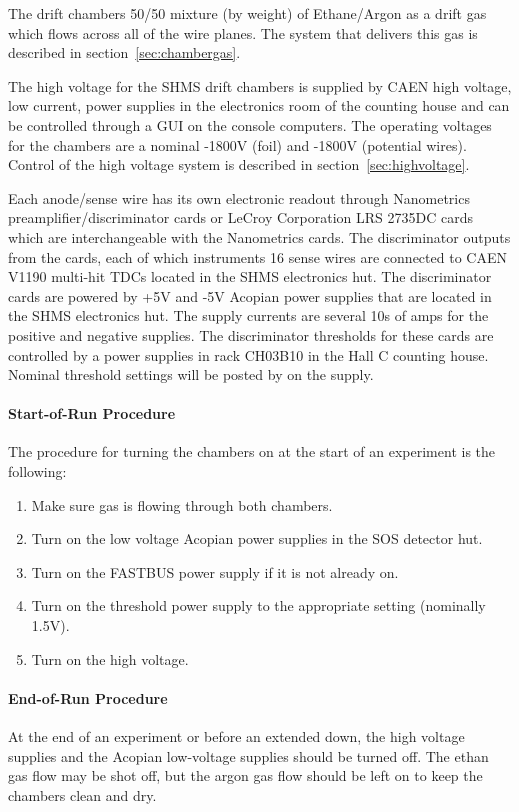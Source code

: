 {The drift chambers 50/50 mixture (by weight) of Ethane/Argon as a
drift gas which
flows across all of the wire planes.  The system that delivers this
gas is described in section~\ref{sec:chambergas}.

The high voltage for the SHMS drift chambers is supplied by CAEN
high voltage, low current, power supplies in the electronics room of
the counting
house and can be controlled through a GUI on the console computers.
The operating voltages for the chambers are a nominal -1800V (foil) and -1800V
(potential wires).  Control of the high voltage system is described in
section~\ref{sec:highvoltage}.

Each anode/sense wire has its own electronic readout through
Nanometrics preamplifier/discriminator cards or LeCroy Corporation LRS
2735DC cards which are interchangeable with the Nanometrics cards.
The discriminator outputs from the cards, each of which instruments 16
sense wires are connected to CAEN V1190 multi-hit TDCs located in the
SHMS electronics hut.
The discriminator cards are powered by +5V and -5V Acopian power
supplies that are
located in the SHMS electronics hut.  The supply currents are several
10s of amps for the positive and negative supplies.
The discriminator thresholds for these cards are controlled by a power
supplies in rack CH03B10 in the Hall C counting house.  Nominal
threshold settings will be posted by on the supply.

\paragraph{Start-of-Run Procedure}
The procedure for turning the chambers on at the start of an
experiment is the following:
\begin{enumerate}
\item Make sure gas is flowing through both chambers.
\item Turn on the low voltage Acopian power supplies in the SOS detector hut.
\item Turn on the FASTBUS power supply if it is not already on.
\item Turn on the threshold power supply to the appropriate setting
  (nominally 1.5V).
\item Turn on the high voltage.
\end{enumerate}

\paragraph{End-of-Run Procedure}
At the end of an experiment or before an extended down, the high
voltage supplies and the Acopian low-voltage supplies should be turned
off.  The ethan gas flow may be shot off, but the argon gas flow
should be left on to keep the chambers clean and dry.

}%
